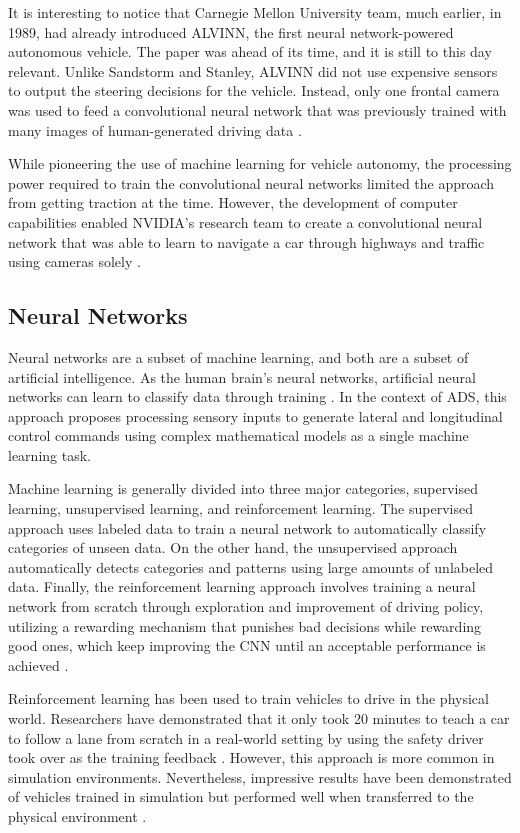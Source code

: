 \documentclass[12pt]{article}
\begin{document}
It is interesting to notice that Carnegie Mellon University team, much earlier, in 1989, had already introduced ALVINN, the first neural network-powered autonomous vehicle. The paper was ahead of its time, and it is still to this day relevant. Unlike Sandstorm and Stanley, ALVINN  did not use expensive sensors to output the steering decisions for the vehicle. Instead, only one frontal camera was used to feed a convolutional neural network that was previously trained with many images of human-generated driving data \parencite{alvinn}. 

While pioneering the use of machine learning for vehicle autonomy, the processing power required to train the convolutional neural networks limited the approach from getting traction at the time. However, the development of computer capabilities enabled NVIDIA's research team to create a convolutional neural network that was able to learn to navigate a car through highways and traffic using cameras solely \parencite{nvidia}. 

\subsection{Neural Networks}

Neural networks are a subset of machine learning, and both are a subset of artificial intelligence. As the human brain's neural networks, artificial neural networks can learn to classify data through training \parencite{chang2018}. In the context of ADS, this approach proposes processing sensory inputs to generate lateral and longitudinal control commands using complex mathematical models as a single machine learning task.

Machine learning is generally divided into three major categories, supervised learning, unsupervised learning, and reinforcement learning. The supervised approach uses labeled data to train a neural network to automatically classify categories of unseen data. On the other hand, the unsupervised approach automatically detects categories and patterns using large amounts of unlabeled data. Finally, the reinforcement learning approach involves training a neural network from scratch through exploration and improvement of driving policy, utilizing a rewarding mechanism that punishes bad decisions while rewarding good ones, which keep improving the CNN until an acceptable performance is achieved \parencite{tampuu}. 

Reinforcement learning has been used to train vehicles to drive in the physical world. Researchers have demonstrated that it only took 20 minutes to teach a car to follow a lane from scratch in a real-world setting by using the safety driver took over as the training feedback \parencite{driveday}. However, this approach is more common in simulation environments. Nevertheless, impressive results have been demonstrated of vehicles trained in simulation but performed well when transferred to the physical environment \parencite{reinforcement}. 
\end{document}
